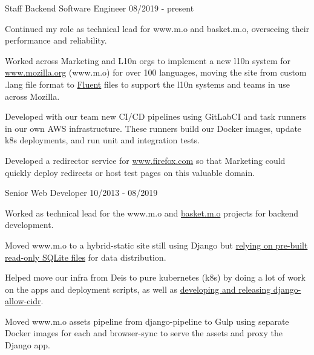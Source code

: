 \documentclass[11pt]{article} %
\begin{document}
\begin{description}
\squish
{}
           {Staff Backend Software Engineer}
           {08/2019 - present}

\item Continued my role as technical lead for www.m.o and basket.m.o, overseeing their performance and reliability.

\item Worked across Marketing and L10n orgs to implement a new l10n system for \href{https://github.com/mozilla/bedrock/}{www.mozilla.org} (www.m.o)
for over 100 languages, moving the site from custom .lang file format to \href{https://www.projectfluent.org/}{Fluent} files to support
the l10n systems and teams in use across Mozilla.

\item Developed with our team new CI/CD pipelines using GitLabCI and task runners in our own AWS infrastructure.
These runners build our Docker images, update k8s deployments, and run unit and integration tests.

\item Developed a redirector service for \href{https://github.com/mozmeao/www.firefox.com/}{www.firefox.com} so that Marketing could quickly deploy redirects or host
test pages on this valuable domain.

           {Senior Web Developer}
           {10/2013 - 08/2019}

\item Worked as technical lead for the www.m.o and \href{https://github.com/mozmeao/basket/}{basket.m.o} projects for backend development.

\item Moved www.m.o to a hybrid-static site still using Django but
\href{https://mozilla.github.io/meao/2018/03/28/bedrock-the-sqlitening/}{relying on pre-built read-only SQLite files} for
data distribution.

\item Helped move our infra from Deis to pure kubernetes (k8s) by doing a lot of work on the apps and deployment scripts,
as well as \href{https://mozilla.github.io/meao/2018/02/27/django-k8s-elb-health-checks/}{developing and releasing django-allow-cidr}.

\item Moved www.m.o assets pipeline from django-pipeline to Gulp using separate Docker images for each and browser-sync to serve the assets
and proxy the Django app.


\end{description}
\end{document}

